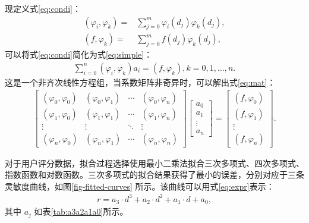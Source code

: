 现定义式\eqref{eq:condi}：
\begin{equation}
\begin{aligned}
(\varphi_i,\varphi_k) =& \sum^{m}_{j=0}\varphi_i(d_j)\varphi_k(d_j),\\ 
(f,\varphi_k) =& \sum^{m}_{j=0}f(d_j)\varphi_k(d_j),
\end{aligned}
\label{eq:condi}
\end{equation}
可以将式\eqref{eq:condi}简化为式\eqref{eq:simple}：
\begin{equation}
\begin{aligned}
\sum^{n}_{i=0}(\varphi_i,\varphi_k)a_i = (f,\varphi_k), k = 0, 1, ..., n.
\end{aligned}
\label{eq:simple}
\end{equation}
这是一个非齐次线性方程组，当系数矩阵非奇异时，可以解出式\eqref{eq:mat}：
\begin{equation}
\begin{aligned}
\begin{bmatrix}  
  (\varphi_0,\varphi_0) & (\varphi_0,\varphi_1) & \cdots & (\varphi_0,\varphi_n) \\  
  (\varphi_1,\varphi_0) & (\varphi_1,\varphi_1) & \cdots & (\varphi_1,\varphi_n) \\  
  \vdots & \vdots & \ddots & \vdots \\  
  (\varphi_n,\varphi_0) & (\varphi_n,\varphi_1) & \cdots & (\varphi_n,\varphi_n)  
\end{bmatrix} \begin{bmatrix}  
   a_0 \\  
  a_1 \\  
  \vdots \\  
  a_n  
\end{bmatrix}  = \begin{bmatrix}  
   (f,\varphi_0) \\  
  (f,\varphi_1) \\  
  \vdots \\  
  (f,\varphi_n)
\end{bmatrix}.\end{aligned}
\label{eq:mat}
\end{equation}

对于用户评分数据，拟合过程选择使用最小二乘法拟合三次多项式、四次多项式、指数函数和对数函数。三次多项式的拟合结果获得了最小的误差，分别对应于三条灵敏度曲线，如图\ref{fig-fitted-curves} 所示。该曲线可以用式\eqref{eq:expr}表示：
\begin{equation}
\begin{aligned}
r = a_3 \cdot d^{3} + a_2 \cdot d^{2} + a_1 \cdot d + a_0,
\end{aligned}
\label{eq:expr}
\end{equation}
其中 $a_j$ 如表\ref{tab:a3a2a1a0}所示。


